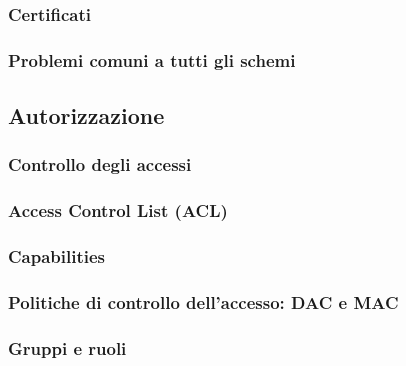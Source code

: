 \documentclass[a4paper]{article}
\begin{document}
	\subsubsection{Certificati}
	
	\subsubsection{Problemi comuni a tutti gli schemi}
	
	\subsection{Autorizzazione}
	
	\subsubsection{Controllo degli accessi}
	
	\subsubsection{Access Control List (ACL)}
	
	\subsubsection{Capabilities}
	
	\subsubsection{Politiche di controllo dell'accesso: DAC e MAC}
	
	\subsubsection{Gruppi e ruoli}
\end{document}
